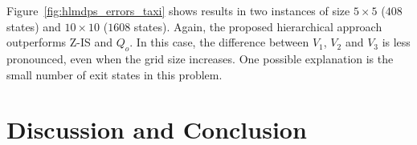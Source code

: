 
Figure~\ref{fig:hlmdps_errors_taxi} shows results in two instances of size $5 \times 5$ ($408$ states) and $10 \times 10$ ($1608$ states). %
Again, the proposed hierarchical approach outperforms Z-IS and $Q_o$.
In this case, the difference between $V_1$, $V_2$ and $V_3$ is less pronounced, even when the grid size increases. One possible explanation is the small number of exit states in this problem.


\section{Discussion and Conclusion}

